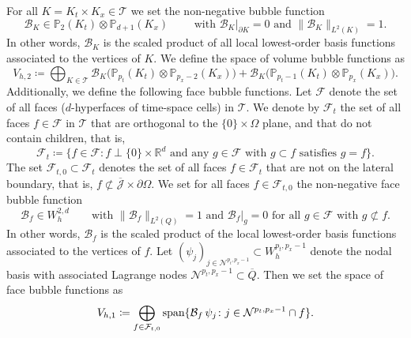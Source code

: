 \documentclass{amsart}
\providecommand{\tria}{\mathcal{T}}
\newcommand{\cJ}{\mathcal J}
\begin{document}
For all $K = K_t \times K_x \in \tria$ we set the non-negative bubble function
\begin{equation*}
\mathcal{B}_K \in \mathbb{P}_2(K_t) \otimes \mathbb{P}_{d+1}(K_x)\qquad\text{ with } \mathcal{B}_K|_{\partial K} = 0\text{ and } \lVert \mathcal{B}_K \rVert_{L^2(K)} = 1.
\end{equation*}
In other words, $\mathcal{B}_K$ is the scaled product of all local lowest-order basis functions associated to the vertices of $K$. We define the space of volume bubble functions as 
\begin{equation} \label{eq:volumebubble}
V_{h,2} \coloneqq \bigoplus_{K\in \tria} \mathcal{B}_K \big(\mathbb{P}_{p_t}(K_t) \otimes \mathbb{P}_{p_x-2}(K_x)\big) + \mathcal{B}_K \big(\mathbb{P}_{p_t-1}(K_t) \otimes \mathbb{P}_{p_x}(K_x)\big).
\end{equation}
%
Additionally, we define the following face bubble functions. 
Let $\mathcal{F}$ denote the set of all faces ($d$-hyperfaces of time-space cells) in $\tria$. 
We denote by $\mathcal{F}_t$ the set of all faces $f\in \mathcal{F}$ in $\tria$ that are orthogonal to the $\{0\} \times \Omega$ plane, and that do not contain children, that is,
\begin{equation*}
\mathcal{F}_t \coloneqq \lbrace f \in \mathcal{F} \colon f \perp \lbrace 0 \rbrace \times \mathbb{R}^d\text{ and any } g\in \mathcal{F}\text{ with } g \subset f \text{ satisfies }g =f  \rbrace.
\end{equation*}
The set $\mathcal{F}_{t,0} \subset \mathcal{F}_t$  denotes the set of all faces $f\in \mathcal{F}_t$ that are not on the lateral boundary, that is, $f\not \subset \overline{\cJ} \times \partial\Omega$.
We set for all faces $f \in \mathcal{F}_{t,0}$ the non-negative face bubble function
\begin{equation*}
\mathcal{B}_f \in W^{2,d}_h\qquad\text{with } \lVert \mathcal{B}_f \rVert_{L^2(Q)}=1\text{ and }\mathcal{B}_f|_g = 0\text{ for all }g\in \mathcal{F} \text{ with }g\not\subset f.
\end{equation*}
In other words, $\mathcal{B}_f$ is the scaled product of the local lowest-order basis functions associated to the vertices of $f$. Let $(\psi_j)_{j\in \mathcal{N}^{p_t,p_x-1}} \subset W^{p_t,p_x-1}_h$ denote the nodal basis with associated Lagrange nodes $\mathcal{N}^{p_t,p_x-1} \subset \overline{Q}$. Then we set the space of face bubble functions as 
\begin{equation} \label{eq:facebubble}
V_{h,1} \coloneqq \bigoplus_{f\in \mathcal{F}_{t,0}} \textup{span} \lbrace \mathcal{B}_f\, \psi_j \colon j \in \mathcal{N}^{p_t,p_x-1} \cap f  \rbrace.
\end{equation}
\end{document}
